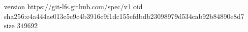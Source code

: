version https://git-lfs.github.com/spec/v1
oid sha256:e4a444ae013c5e9c4b3916c9f1dc155efdbdb23098979d534cab92b84890e8d7
size 349692
